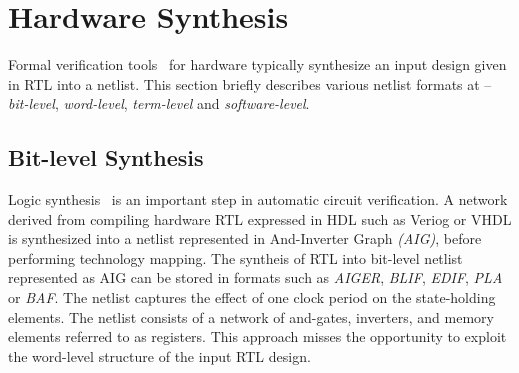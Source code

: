 \section{Hardware Synthesis}\label{sec:abstraction}
%
Formal verification tools~\cite{abc,DBLP:conf/fmcad/BradleyM07,vis} for 
hardware typically synthesize an input design given in RTL into a netlist.  
This section briefly describes various netlist formats at -- \emph{bit-level},
\emph{word-level}, \emph{term-level} and \emph{software-level}.  
%
%
\subsection{Bit-level Synthesis}
Logic synthesis~\cite{ls1,ls2} is an important step in automatic circuit verification. 
A network derived from compiling hardware RTL expressed in HDL such 
as Veriog or VHDL is synthesized into a netlist represented in 
And-Inverter Graph \emph{(AIG)}, before performing technology mapping.   
The syntheis of RTL into bit-level netlist represented as AIG can be 
stored in formats such as 
\emph{AIGER}, \emph{BLIF}, \emph{EDIF}, \emph{PLA} or \emph{BAF}.  
The netlist captures the effect of one clock period on the 
state-holding elements.  The netlist consists of a network of 
and-gates, inverters, and memory elements referred to as registers.  
This approach misses the opportunity to exploit the word-level 
structure of the input RTL design.  

